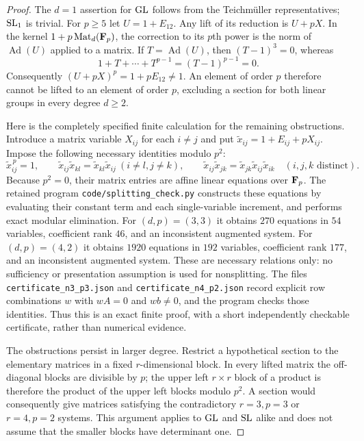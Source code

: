 \begin{proof}
The $d=1$ assertion for $\operatorname{GL}$ follows from the Teichm\"uller representatives; $\operatorname{SL}_1$ is trivial.  For $p\geq5$ let $U=1+E_{12}$.  Any lift of its reduction is $U+pX$.  In the kernel $1+p\operatorname{Mat}_d(\mathbf F_p)$, the correction to its $p$th power is the norm of $\operatorname{Ad}(U)$ applied to a matrix.  If $T=\operatorname{Ad}(U)$, then $(T-1)^3=0$, whereas
\[
 1+T+\cdots+T^{p-1}=(T-1)^{p-1}=0.
\]
Consequently $(U+pX)^p=1+pE_{12}\ne1$.  An element of order $p$ therefore cannot be lifted to an element of order $p$, excluding a section for both linear groups in every degree $d\geq2$.

Here is the completely specified finite calculation for the remaining obstructions.  Introduce a matrix variable $X_{ij}$ for each $i\ne j$ and put $\widetilde x_{ij}=1+E_{ij}+pX_{ij}$.  Impose the following necessary identities modulo $p^2$:
\[
 \widetilde x_{ij}^{\,p}=1,\qquad
 \widetilde x_{ij}\widetilde x_{kl}=\widetilde x_{kl}\widetilde x_{ij}\ (i\ne l, j\ne k),\qquad
 \widetilde x_{ij}\widetilde x_{jk}=\widetilde x_{jk}\widetilde x_{ij}\widetilde x_{ik}
 \quad(i,j,k\text{ distinct}).
\]
Because $p^2=0$, their matrix entries are affine linear equations over $\mathbf F_p$.  The retained program \texttt{code/splitting\_check.py} constructs these equations by evaluating their constant term and each single-variable increment, and performs exact modular elimination.  For $(d,p)=(3,3)$ it obtains $270$ equations in $54$ variables, coefficient rank $46$, and an inconsistent augmented system.  For $(d,p)=(4,2)$ it obtains $1920$ equations in $192$ variables, coefficient rank $177$, and an inconsistent augmented system.  These are necessary relations only: no sufficiency or presentation assumption is used for nonsplitting.  The files \texttt{certificate\_n3\_p3.json} and \texttt{certificate\_n4\_p2.json} record explicit row combinations $w$ with $wA=0$ and $wb\ne0$, and the program checks those identities.  Thus this is an exact finite proof, with a short independently checkable certificate, rather than numerical evidence.

The obstructions persist in larger degree.  Restrict a hypothetical section to the elementary matrices in a fixed $r$-dimensional block.  In every lifted matrix the off-diagonal blocks are divisible by $p$; the upper left $r\times r$ block of a product is therefore the product of the upper left blocks modulo $p^2$.  A section would consequently give matrices satisfying the contradictory $r=3,p=3$ or $r=4,p=2$ systems.  This argument applies to $\operatorname{GL}$ and $\operatorname{SL}$ alike and does not assume that the smaller blocks have determinant one.


\end{proof}
